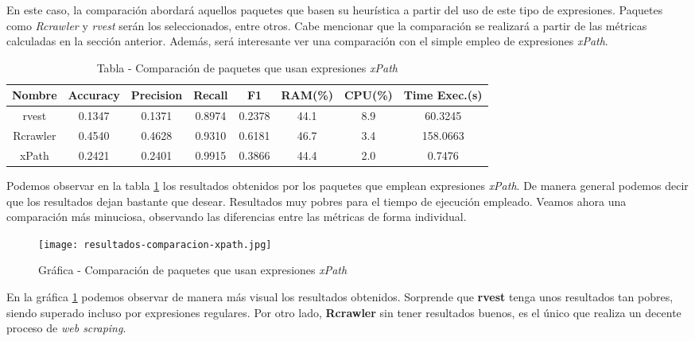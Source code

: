 En este caso, la comparación abordará aquellos paquetes que basen su heurística a partir del uso de este
tipo de expresiones. Paquetes como \emph{Rcrawler} y \emph{rvest} serán los seleccionados, entre otros.
Cabe mencionar que la comparación se realizará a partir de las métricas calculadas en la sección anterior.
Además, será interesante ver una comparación con el simple empleo de expresiones \emph{xPath}.

\begin{table}[h]
    \begin{center}
      \begin{tabular}{| c | c | c | c | c | c | c | c |} \hline 
       \textbf{Nombre} & \textbf{Accuracy} & \textbf{Precision}  & \textbf{Recall} & \textbf{F1} & \textbf{RAM(\%)} & \textbf{CPU(\%)} & \textbf{Time Exec.(s)} \\ \hline
       rvest & 0.1347 & 0.1371 & 0.8974 & 0.2378 & 44.1 & 8.9 & 60.3245 \\ \hline
       Rcrawler & 0.4540 & 0.4628 & 0.9310 & 0.6181 & 46.7 & 3.4 & 158.0663 \\ \hline
       xPath & 0.2421 & 0.2401 & 0.9915 & 0.3866 & 44.4 & 2.0 & 0.7476 \\ \hline
      \end{tabular}
      \caption{Tabla - Comparación de paquetes que usan expresiones \emph{xPath}}
      \label{tab:tabla - comparacion de paquetes que usan expresiones xpath}
    \end{center}
\end{table}

Podemos observar en la tabla \ref{tab:tabla - comparacion de paquetes que usan expresiones xpath} los
resultados obtenidos por los paquetes que emplean expresiones \emph{xPath}. De manera general podemos decir
que los resultados dejan bastante que desear. Resultados muy pobres para el tiempo de ejecución empleado.
Veamos ahora una comparación más minuciosa, observando las diferencias entre las métricas de forma individual.

\begin{figure}[tphb]
    \centering
    \texttt{[image: resultados-comparacion-xpath.jpg]}
    \caption{Gráfica - Comparación de paquetes que usan expresiones \emph{xPath}}
    \label{img:grafica - comparacion de paquetes que usan expresiones xpath}
\end{figure}

En la gráfica \ref{img:grafica - comparacion de paquetes que usan expresiones xpath} podemos observar de 
manera más visual los resultados obtenidos. Sorprende que \textbf{rvest} tenga unos resultados tan pobres, 
siendo superado incluso por expresiones regulares. Por otro lado, \textbf{Rcrawler} sin tener resultados 
buenos, es el único que realiza un decente proceso de \emph{web scraping}.

